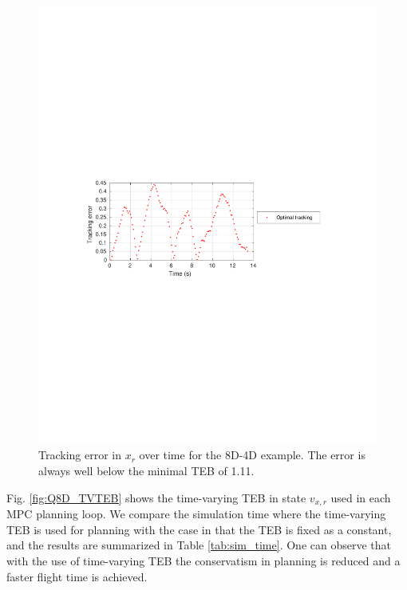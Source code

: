 \begin{figure}
  \includegraphics[width=\columnwidth]{fig/Q8D_Q4D/quad8D_tracking_error}
  \caption{Tracking error in $x_{r}$ over time for the 8D-4D example. The error is always well below the minimal TEB of 1.11.}
  \label{fig:Q8D_tracking_error}
\end{figure}

Fig. \ref{fig:Q8D_TVTEB} shows the time-varying TEB in state $v_{x,r}$ used in each MPC planning loop. We compare the simulation time where the time-varying TEB is used for planning with the case in that the TEB is fixed as a constant, and the results are summarized in Table \ref{tab:sim_time}. One can observe that with the use of time-varying TEB the conservatism in planning is reduced and a faster flight time is achieved.

